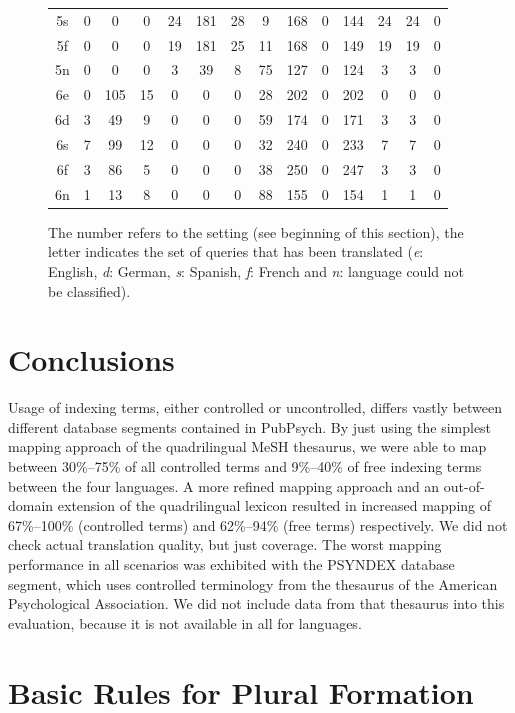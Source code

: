 \documentclass[a4paper,11pt]{article}
\begin{document}
\begin{figure}
\begin{tabular}{c|c|c|c|c|c|c|c|c|c|c|c|c|c}
			5s & 0 & 0 & 0 & 24 & 181 & 28 & 9 & 168 & 0 & 144 & 24 & 24 & 0 \\
			5f & 0 & 0 & 0 & 19 & 181 & 25 & 11 & 168 & 0 & 149 & 19 & 19 & 0 \\
			5n & 0 & 0 & 0 & 3 & 39 & 8 & 75 & 127 & 0 & 124 & 3 & 3 & 0 \\
			6e & 0 & 105 & 15 & 0 & 0 & 0 & 28 & 202 & 0 & 202 & 0 & 0 & 0 \\
			6d & 3 & 49 & 9 & 0 & 0 & 0 & 59 & 174 & 0 & 171 & 3 & 3 & 0 \\
			6s & 7 & 99 & 12 & 0 & 0 & 0 & 32 & 240 & 0 & 233 & 7 & 7 & 0 \\
			6f & 3 & 86 & 5 & 0 & 0 & 0 & 38 & 250 & 0 & 247 & 3 & 3 & 0\\
			6n & 1 & 13 & 8 & 0 & 0 & 0 & 88 & 155 & 0 & 154 & 1 & 1 & 0\\
		\end{tabular}
		\caption{The number refers to the setting (see beginning of this section), the letter indicates the set of queries that has been translated (\textit{e}: English, \textit{d}: German, \textit{s}: Spanish, \textit{f}: French and \textit{n}: language could not be classified).}
		\label{fig:eval}
	\end{figure}
	
	\section{Conclusions}
	\label{s:conclusions}
	
	Usage of indexing terms, either controlled or uncontrolled, differs vastly between different database segments contained in PubPsych. By just using the simplest mapping approach of the quadrilingual MeSH thesaurus, we were able to map between 30\%--75\% of all controlled terms and 9\%--40\% of free indexing terms between the four languages. A more refined mapping approach and an out-of-domain extension of the quadrilingual lexicon resulted in increased mapping of 67\%--100\% (controlled terms) and 62\%--94\% (free terms) respectively. We did not check actual translation quality, but just coverage. The worst mapping performance in all scenarios was exhibited with the PSYNDEX database segment, which uses controlled terminology from the thesaurus of the American Psychological Association. We did not include data from that thesaurus into this evaluation, because it is not available in all for languages.
	
	\appendix
	\section{Basic Rules for Plural Formation}
	\label{ap:plural}
	
\end{document}
